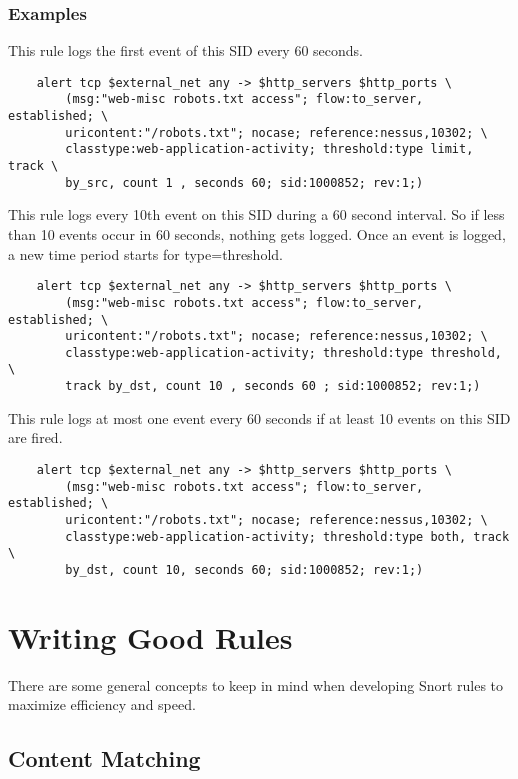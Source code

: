 \documentclass[english]{report}
\begin{document}
\subsubsection{Examples}

This rule logs the first event of this SID every 60 seconds.

\begin{verbatim}
    alert tcp $external_net any -> $http_servers $http_ports \
        (msg:"web-misc robots.txt access"; flow:to_server, established; \
        uricontent:"/robots.txt"; nocase; reference:nessus,10302; \
        classtype:web-application-activity; threshold:type limit, track \
        by_src, count 1 , seconds 60; sid:1000852; rev:1;)
\end{verbatim}

This rule logs every 10th event on this SID during a 60 second interval. So if
less than 10 events occur in 60 seconds, nothing gets logged.  Once an event is
logged, a new time period starts for type=threshold.

\begin{verbatim}
    alert tcp $external_net any -> $http_servers $http_ports \
        (msg:"web-misc robots.txt access"; flow:to_server, established; \
        uricontent:"/robots.txt"; nocase; reference:nessus,10302; \
        classtype:web-application-activity; threshold:type threshold, \
        track by_dst, count 10 , seconds 60 ; sid:1000852; rev:1;)
\end{verbatim}

This rule logs at most one event every 60 seconds if at least 10 events on this
SID are fired.

\begin{verbatim}
    alert tcp $external_net any -> $http_servers $http_ports \
        (msg:"web-misc robots.txt access"; flow:to_server, established; \
        uricontent:"/robots.txt"; nocase; reference:nessus,10302; \
        classtype:web-application-activity; threshold:type both, track \
        by_dst, count 10, seconds 60; sid:1000852; rev:1;)
\end{verbatim}

\section{Writing Good Rules}

There are some general concepts to keep in mind when developing Snort rules to
maximize efficiency and speed.

\subsection{Content Matching}
\end{document}
